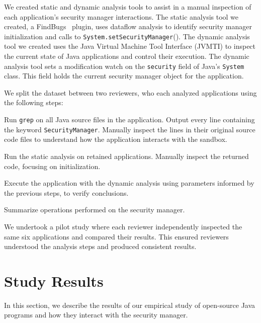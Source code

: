 \documentclass{sig-alternate}
\begin{document}
We created static and dynamic analysis tools
to assist in a manual inspection of each application's security manager
interactions. The static analysis tool we created, a 
FindBugs~\cite{hovemeyer_finding_2004} plugin,
uses dataflow analysis to identify security manager initialization and calls to \texttt{System.setSecurityManager}().
The dynamic analysis tool we created uses the Java Virtual Machine
Tool Interface (JVMTI) \cite{_jvmti}
to inspect the current state of Java applications and control
their execution. The dynamic analysis tool sets a modification watch
on the \texttt{security} field of Java's \texttt{System} class. This
field holds the current security manager object for the application.

We split the dataset between two reviewers, who each analyzed
applications using the following steps:

\begin{flushenum}\setlength{\parskip}{0pt}
  \setlength{\parsep}{0pt}
  \setlength{\itemsep}{0pt}
\item Run \texttt{grep} on all Java source files in the application.
Output every line containing the keyword \texttt{SecurityManager}.
Manually inspect the lines in their original source code files to understand
how the application interacts with the sandbox.
\item Run the static analysis on retained applications. Manually inspect the
  returned code, focusing on initialization. 
\item Execute the application with the dynamic analysis using parameters
  informed by the previous steps, 
to verify conclusions.
\item Summarize operations performed
on the security manager.
\end{flushenum}

We undertook a pilot study where each reviewer
independently inspected the same six applications and compared their
results. This ensured reviewers understood the analysis steps and produced
consistent results.


\section{Study Results}\label{sec:Study-results}

In this section, we describe the results of our empirical study of open-source
Java programs and how they interact with the security manager. 
\end{document}
